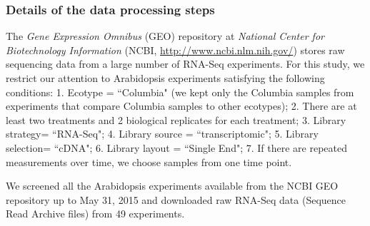 \documentclass[letterpaper,12pt]{article}
\begin{document}
\subsubsection*{Details of the data processing steps}
The \textit{Gene Expression Omnibus} (GEO) repository at \textit{National
Center for Biotechnology Information} (NCBI,
\url{http://www.ncbi.nlm.nih.gov/}) stores raw sequencing data from a large
number of RNA-Seq experiments.  For this study, we restrict our attention to
Arabidopsis experiments satisfying the following conditions: 1.  Ecotype =
``Columbia" (we kept only the Columbia samples from experiments that compare
Columbia samples to other ecotypes); 2. There are at least two treatments and 2 biological replicates for each
treatment; 3. Library strategy= ``RNA-Seq"; 4.
Library source = ``transcriptomic"; 5.  Library selection= ``cDNA"; 6.  Library
layout = ``Single End"; 7. If there are repeated measurements over time, we choose samples from one time point. 

 We screened all the Arabidopsis experiments available from the NCBI
GEO repository up to May 31, 2015 and downloaded raw RNA-Seq data (Sequence Read Archive files)
from 49 experiments. %
\end{document}
